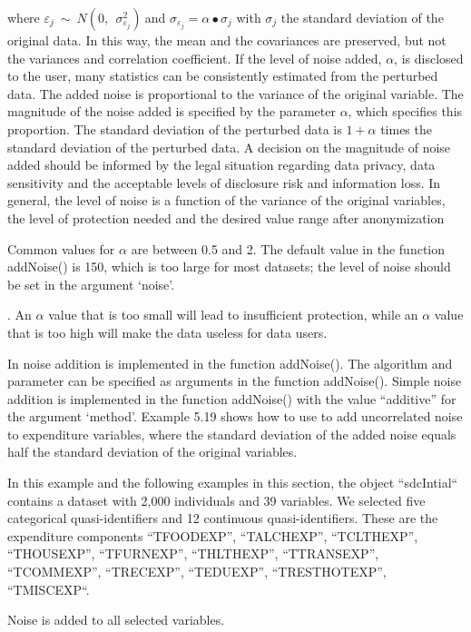 \documentclass[letterpaper,10pt,english]{sphinxmanual}
\begin{document}
where
\(\varepsilon_{j}\ \sim\ N(0,\ \ \sigma_{\varepsilon_{j}}^{2})\ \)and
\(\sigma_{\varepsilon_{j}} = \alpha \bullet \sigma_{j}\) with
\(\sigma_{j}\) the standard deviation of the original data. In this
way, the mean and the covariances are preserved, but not the variances
and correlation coefficient. If the level of noise added,
\(\alpha\), is disclosed to the user, many statistics can be
consistently estimated from the perturbed data. The added noise is
proportional to the variance of the original variable. The magnitude of
the noise added is specified by the parameter \(\alpha\), which
specifies this proportion. The standard deviation of the perturbed data
is \(1 + \alpha\) times the standard deviation of the perturbed
data. A decision on the magnitude of noise added should be informed by
the legal situation regarding data privacy, data sensitivity and the
acceptable levels of disclosure risk and information loss. In general,
the level of noise is a function of the variance of the original
variables, the level of protection needed and the desired value range
after anonymization %
\begin{footnote}[18]\sphinxAtStartFootnote
Common values for \(\alpha\) are between 0.5 and 2. The default
value in the  function addNoise() is 150, which is too
large for most datasets; the level of noise should be set in the
argument ‘noise’.
%
\end{footnote}. An \(\alpha\) value that
is too small will lead to insufficient protection, while an
\(\alpha\) value that is too high will make the data useless for
data users.

In  noise addition is implemented in the function addNoise().
The algorithm and parameter can be specified as arguments in the
function addNoise(). Simple noise addition is implemented in the
function addNoise() with the value “additive” for the argument ‘method’.
Example 5.19 shows how to use  to add uncorrelated noise to
expenditure variables, where the standard deviation of the added noise
equals half the standard deviation of the original
variables. %
\begin{footnote}[19]\sphinxAtStartFootnote
In this example and the following examples in this section, the
 object “sdcIntial“ contains a dataset with 2,000
individuals and 39 variables. We selected five categorical
quasi-identifiers and 12 continuous quasi-identifiers. These are the
expenditure components “TFOODEXP”, “TALCHEXP”, “TCLTHEXP”,
“THOUSEXP”, “TFURNEXP”, “THLTHEXP”, “TTRANSEXP”, “TCOMMEXP”,
“TRECEXP”, “TEDUEXP”, “TRESTHOTEXP”, “TMISCEXP“.
%
\end{footnote} Noise is added to all selected
variables.
\end{document}
